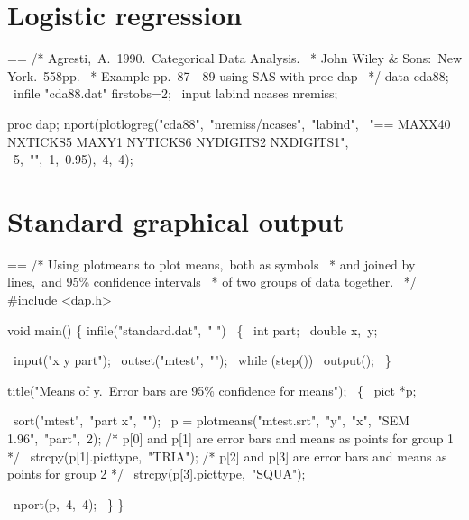\documentclass{book}
\makeatletter
\newenvironment{Texinfopreformatted}{%
  \par\GNUTobeylines\obeyspaces\frenchspacing\parskip=\z@\parindent=\z@}{}
{\catcode`\^^M=13 \gdef\GNUTobeylines{\catcode`\^^M=13 \def^^M{\null\par}}}
\newenvironment{Texinfoindented}{\begin{list}{}{}\item\relax}{\end{list}}
\renewcommand{\_}{\Texinfounderscore\discretionary{}{}{}}
\makeatother
\begin{document}
\section{{Logistic regression}}
\label{anchor:Logistic-regression-examples}%
%
%

\begin{Texinfoindented}
\begin{Texinfopreformatted}%
\ttfamily /* Agresti,\ A.\  1990.\  Categorical Data Analysis.
\ * John Wiley \& Sons:\ New York.\  558pp.
\ * Example pp.\ 87 - 89 using SAS with proc dap
\ */
data cda88;
\  infile "cda88.dat" firstobs=2;
\  input labind ncases nremiss;

proc dap;
nport(plotlogreg("cda88",\ "nremiss/ncases",\ "labind",
\                 "== MAXX40 NXTICKS5 MAXY1 NYTICKS6 NYDIGITS2 NXDIGITS1",
\                 5,\ "",\ 1,\ 0.95),\ 4,\ 4);


\end{Texinfopreformatted}
\end{Texinfoindented}

\section{{Standard graphical output}}
\label{anchor:Standard-graphical-output}%

\begin{Texinfoindented}
\begin{Texinfopreformatted}%
\ttfamily /* Using plotmeans to plot means,\ both as symbols
\ * and joined by lines,\ and 95\% confidence intervals
\ * of two groups of data together.
\ */
\#include <dap.h>

void main()
\{
infile("standard.dat",\ " ")
\  \{
\    int part;
\    double x,\ y;

\    input("x y part");
\    outset("mtest",\ "");
\    while (step())
\      output();
\  \}

title("Means of y.\ Error bars are 95\% confidence for means");
\  \{
\    pict *p;

\    sort("mtest",\ "part x",\ "");
\    p = plotmeans("mtest.srt",\ "y",\ "x",\ "SEM 1.96",\ "part",\ 2);
/* p[0] and p[1] are error bars and means as points for group 1 */
\    strcpy(p[1].pict\_type,\ "TRIA");
/* p[2] and p[3] are error bars and means as points for group 2 */
\    strcpy(p[3].pict\_type,\ "SQUA");

\    nport(p,\ 4,\ 4);
\  \}
\}
\end{Texinfopreformatted}
\end{Texinfoindented}
\end{document}

